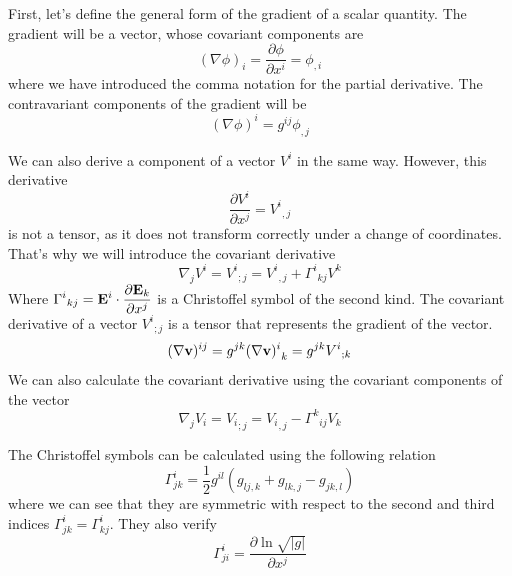 First, let's define the general form of the gradient of a scalar quantity. The gradient will be a vector,
whose covariant components are
\begin{equation}
(\nabla\phi)_i=\frac{\partial\phi}{\partial x^i}=\phi_{,i}
\end{equation}
where we have introduced the comma notation for the partial derivative. The contravariant components of 
the gradient will be
\begin{equation}
(\nabla\phi)^i=g^{ij}\phi_{,j}
\end{equation}

We can also derive a component of a vector $V^i$ in the same way. However, this derivative
\begin{equation}
\frac{\partial V^i}{\partial x^j}={V^i}_{,j}
\end{equation}
is not a tensor, as it does not transform correctly under a change of coordinates. That's why we will introduce
the covariant derivative
\begin{equation}
\nabla_jV^i={V^i}_{;j}={V^i}_{,j}+{\Gamma^i}_{kj}V^k
\end{equation}
Where $\displaystyle{\Gamma^i}_{kj}=\mathbf{E}^i\cdot\frac{\partial \mathbf{E}_k}{\partial x^j}$
is a Christoffel symbol of the second kind. The covariant derivative of a vector ${V^i}_{;j}$ is a tensor
that represents the gradient of the vector.
\begin{equation}
(\nabla\mathbf{v})^{ij}=g^{jk}{(\nabla\mathbf{v})^i}_k=g^{jk}{V^i}_{;k}
\end{equation}
We can also calculate the covariant derivative using the covariant components of the vector
\begin{equation}
\nabla_jV_i={V_i}_{;j}={V_i}_{,j}-{\Gamma^k}_{ij}V_k
\end{equation}

The Christoffel symbols can be calculated using the following relation
\begin{equation}
\Gamma^i_{jk}=
\frac{1}{2}g^{il}(g_{lj,k}+g_{lk,j}-g_{jk,l})
\end{equation}
where we can see that they are symmetric with respect to the second and third indices $\Gamma^i_{jk}=\Gamma^i_{kj}$.
They also verify
\begin{equation}
\Gamma^{i}_{ji}=\frac{\partial\ln\sqrt{|g|}}{\partial x^j}
\end{equation}

